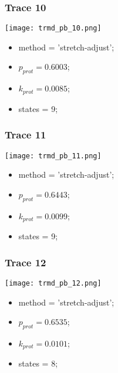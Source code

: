 \subsubsection{Trace 10}
\begin{minipage}[c]{0.7\textwidth}
	\texttt{[image: trmd\_pb\_10.png]}
\end{minipage}
\hfill
\begin{minipage}[c]{0.45\textwidth}
	\begin{itemize}
		\item method = 'stretch-adjust';
		\item $p_{prot}=0.6003$;
		\item $k_{prot}=0.0085$;
		\item states = 9;
	\end{itemize}
\end{minipage}

\subsubsection{Trace 11}
\begin{minipage}[c]{0.7\textwidth}
	\texttt{[image: trmd\_pb\_11.png]}
\end{minipage}
\hfill
\begin{minipage}[c]{0.45\textwidth}
	\begin{itemize}
		\item method = 'stretch-adjust';
		\item $p_{prot}=0.6443$;
		\item $k_{prot}=0.0099$;
		\item states = 9;
	\end{itemize}
\end{minipage}

\subsubsection{Trace 12}
\begin{minipage}[c]{0.7\textwidth}
	\texttt{[image: trmd\_pb\_12.png]}
\end{minipage}
\hfill
\begin{minipage}[c]{0.45\textwidth}
	\begin{itemize}
		\item method = 'stretch-adjust';
		\item $p_{prot}=0.6535$;
		\item $k_{prot}=0.0101$;
		\item states = 8;
	\end{itemize}
\end{minipage}

